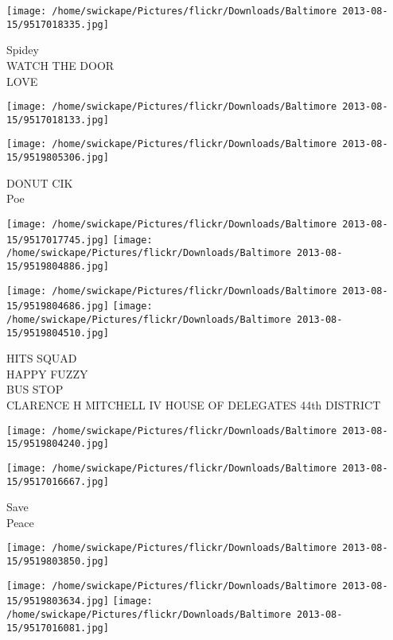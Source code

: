 \documentclass[10pt,letterpaper]{article}
\begin{document}
\vspace{0.25in}
\texttt{[image: /home/swickape/Pictures/flickr/Downloads/Baltimore 2013-08-15/9517018335.jpg]}

Spidey\\
WATCH THE DOOR\\
LOVE\\
\pagebreak

\texttt{[image: /home/swickape/Pictures/flickr/Downloads/Baltimore 2013-08-15/9517018133.jpg]}

\vspace{0.25in}
\texttt{[image: /home/swickape/Pictures/flickr/Downloads/Baltimore 2013-08-15/9519805306.jpg]}

DONUT CIK\\
Poe\\
\pagebreak

\texttt{[image: /home/swickape/Pictures/flickr/Downloads/Baltimore 2013-08-15/9517017745.jpg]}
\texttt{[image: /home/swickape/Pictures/flickr/Downloads/Baltimore 2013-08-15/9519804886.jpg]}

\texttt{[image: /home/swickape/Pictures/flickr/Downloads/Baltimore 2013-08-15/9519804686.jpg]}
\texttt{[image: /home/swickape/Pictures/flickr/Downloads/Baltimore 2013-08-15/9519804510.jpg]}

HITS SQUAD\\
HAPPY FUZZY\\
BUS STOP\\
CLARENCE H MITCHELL IV HOUSE OF DELEGATES 44th DISTRICT\\
\pagebreak

\texttt{[image: /home/swickape/Pictures/flickr/Downloads/Baltimore 2013-08-15/9519804240.jpg]}

\vspace{0.25in}
\texttt{[image: /home/swickape/Pictures/flickr/Downloads/Baltimore 2013-08-15/9517016667.jpg]}

Save\\
Peace\\
\pagebreak

\texttt{[image: /home/swickape/Pictures/flickr/Downloads/Baltimore 2013-08-15/9519803850.jpg]}

\vspace{0.25in}
\texttt{[image: /home/swickape/Pictures/flickr/Downloads/Baltimore 2013-08-15/9519803634.jpg]}
\texttt{[image: /home/swickape/Pictures/flickr/Downloads/Baltimore 2013-08-15/9517016081.jpg]}
\end{document}

